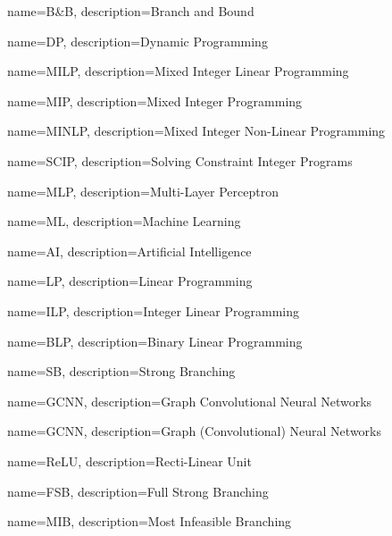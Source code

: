 

\makeglossaries %


{
        name=B\&B,
        description={Branch and Bound}
}

{
        name=DP,
        description={Dynamic Programming}
}

{
        name=MILP,
        description={Mixed Integer Linear Programming}
}

{
        name=MIP,
        description={Mixed Integer Programming}
}

{
        name=MINLP,
        description={Mixed Integer Non-Linear Programming}
}
 
{
        name=SCIP,
        description={Solving Constraint Integer Programs}
}

{
        name=MLP,
        description={Multi-Layer Perceptron}
}

{
        name=ML,
        description={Machine Learning}
}

{
        name=AI,
        description={Artificial Intelligence}
}

{
        name=LP,
        description={Linear Programming}
}

{
        name=ILP,
        description={Integer Linear Programming}
}

{
        name=BLP,
        description={Binary Linear Programming}
}

{
        name=SB,
        description={Strong Branching}
}

{
        name=GCNN,
        description={Graph Convolutional Neural Networks}
}

{
        name=GCNN,
        description={Graph (Convolutional) Neural Networks}
}

{
        name=ReLU,
        description={Recti-Linear Unit}
}

{
        name=FSB,
        description={Full Strong Branching}
}

{
        name=MIB,
        description={Most Infeasible Branching}
}

